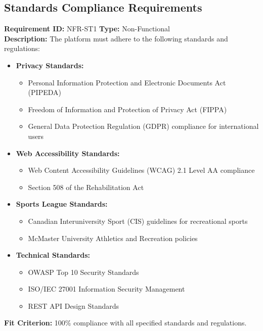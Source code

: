 \documentclass[12pt, titlepage]{article}
\begin{document}
\subsection{Standards Compliance Requirements}
\textbf{Requirement ID:} NFR-ST1 \quad \textbf{Type:} Non-Functional \\
\textbf{Description:} The platform must adhere to the following standards and regulations:
\begin{itemize}
    \item \textbf{Privacy Standards:}
    \begin{itemize}
        \item Personal Information Protection and Electronic Documents Act (PIPEDA) \cite{pipeda2023}
        \item Freedom of Information and Protection of Privacy Act (FIPPA) \cite{fippa2023}
        \item General Data Protection Regulation (GDPR) compliance for international users \cite{gdpr2023}
    \end{itemize}

    \item \textbf{Web Accessibility Standards:}
    \begin{itemize}
        \item Web Content Accessibility Guidelines (WCAG) 2.1 Level AA compliance \cite{wcag2023}
        \item Section 508 of the Rehabilitation Act \cite{section5082023}
    \end{itemize}

    \item \textbf{Sports League Standards:}
    \begin{itemize}
        \item Canadian Interuniversity Sport (CIS) guidelines for recreational sports \cite{cis2023}
        \item McMaster University Athletics and Recreation policies \cite{mcmaster2023}
    \end{itemize}

    \item \textbf{Technical Standards:}
    \begin{itemize}
        \item OWASP Top 10 Security Standards \cite{owasp2023}
        \item ISO/IEC 27001 Information Security Management \cite{iso27001}
        \item REST API Design Standards \cite{rest2023}
    \end{itemize}
\end{itemize}
\textbf{Fit Criterion:} 100\% compliance with all specified standards and regulations.
\end{document}
